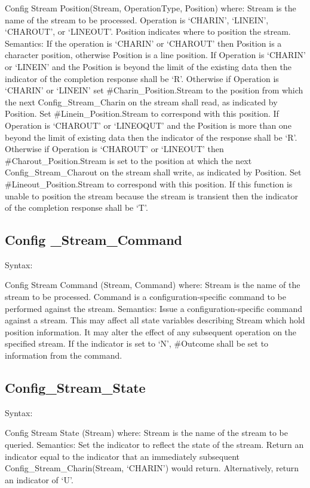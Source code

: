 Config Stream Position(Stream, OperationType, Position) where: Stream is
the name of the stream to be processed. Operation is `CHARIN', `LINEIN',
`CHAROUT', or `LINEOUT'. Position indicates where to position the
stream. Semantics: If the operation is `CHARIN' or `CHAROUT' then
Position is a character position, otherwise Position is a line position.
If Operation is `CHARIN' or `LINEIN' and the Position is beyond the
limit of the existing data then the indicator of the completion response
shall be `R'. Otherwise if Operation is `CHARIN' or `LINEIN' set
\#Charin\_Position.Stream to the position from which the next
Config\_Stream\_Charin on the stream shall read, as indicated by
Position. Set \#Linein\_Position.Stream to correspond with this
position. If Operation is `CHAROUT' or `LINEOQUT' and the Position is
more than one beyond the limit of existing data then the indicator of
the response shall be `R'. Otherwise if Operation is `CHAROUT' or
`LINEOUT' then \#Charout\_Position.Stream is set to the position at
which the next Config\_Stream\_Charout on the stream shall write, as
indicated by Position. Set \#Lineout\_Position.Stream to correspond with
this position. If this function is unable to position the stream because
the stream is transient then the indicator of the completion response
shall be `T'.

\subsection{Config \_Stream\_Command}\label{config-_stream_command}

Syntax:

Config Stream Command (Stream, Command) where: Stream is the name of the
stream to be processed. Command is a configuration-specific command to
be performed against the stream. Semantics: Issue a
configuration-specific command against a stream. This may affect all
state variables describing Stream which hold position information. It
may alter the effect of any subsequent operation on the specified
stream. If the indicator is set to `N', \#Outcome shall be set to
information from the command.

\subsection{Config\_Stream\_State}\label{config_stream_state}

Syntax:

Config Stream State (Stream) where: Stream is the name of the stream to
be queried. Semantics: Set the indicator to reflect the state of the
stream. Return an indicator equal to the indicator that an immediately
subsequent Config\_Stream\_Charin(Stream, `CHARIN') would return.
Alternatively, return an indicator of `U'.

